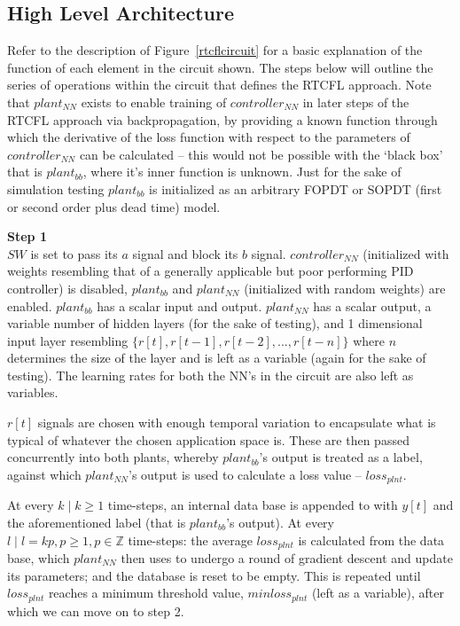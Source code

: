 \documentclass[10pt,twocolumn,letterpaper]{article}
\begin{document}
        \subsection{High Level Architecture} \label{RTCFLarch}

            Refer to the description of Figure~\ref{rtcflcircuit} for a basic explanation of the function of each
            element in the circuit shown. The steps below will outline the series of operations within the circuit that
            defines the RTCFL approach. Note that $plant_{NN}$ exists to enable training of $controller_{NN}$ in later
            steps of the RTCFL approach via backpropagation, by providing a known function through which the derivative
            of the loss function with respect to the parameters of $controller_{NN}$ can be calculated -- this would not
            be possible with the `black box' that is $plant_{bb}$, where it's inner function is unknown. Just for the
            sake of simulation testing $plant_{bb}$ is initialized as an arbitrary FOPDT or SOPDT (first or second order
            plus dead time) model. %

            \textbf{Step 1}\\
            $SW$ is set to pass its $a$ signal and block its $b$ signal. $controller_{NN}$ (initialized with weights
            resembling that of a generally applicable but poor performing PID controller) is disabled, $plant_{bb}$ and
            $plant_{NN}$ (initialized with random weights) are enabled. $plant_{bb}$ has a scalar input and output.
            $plant_{NN}$ has a scalar output, a variable number of hidden layers (for the sake of testing), and 1
            dimensional input layer resembling $\{r[t], r[t-1], r[t-2], ...,r[t-n]\}$ where $n$ determines the size of
            the layer and is left as a variable (again for the sake of testing). The learning rates for both the NN's in
            the circuit are also left as variables.

            $r[t]$ signals are chosen with enough temporal variation to encapsulate what is typical of whatever the
            chosen application space is. These are then passed concurrently into both plants, whereby $plant_{bb}$'s
            output is treated as a label, against which $plant_{NN}$'s output is used to calculate a loss value --
            $loss_{plnt}$. 
            
            At every $k\;|\;k\geq 1$ time-steps, an internal data base is appended to with $y[t]$ and the aforementioned
            label (that is $plant_{bb}$'s output). At every $l\;|\;l=kp, p\geq 1, p\in\mathbb{Z}$ time-steps: the
            average $loss_{plnt}$ is calculated from the data base, which $plant_{NN}$ then uses to undergo a round of
            gradient descent and update its parameters; and the database is reset to be empty. This is repeated until
            $loss_{plnt}$ reaches a minimum threshold value, $minloss_{plnt}$ (left as a variable), after which we can
            move on to step 2.
\end{document}
